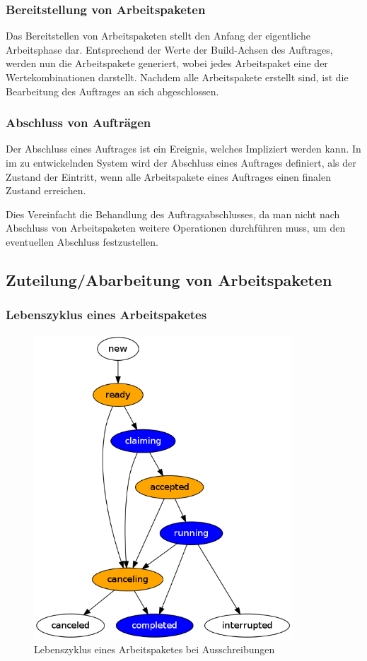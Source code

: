 \subsubsection{Bereitstellung von Arbeitspaketen}

Das Bereitstellen von Arbeitspaketen stellt den Anfang der eigentliche Arbeitsphase dar.
Entsprechend der Werte der Build-Achsen des Auftrages, werden nun die Arbeitspakete generiert,
wobei jedes Arbeitspaket eine der Wertekombinationen darstellt.
Nachdem alle Arbeitspakete erstellt sind, ist die Bearbeitung des Auftrages an sich abgeschlossen.

\subsubsection{Abschluss von Aufträgen}

Der Abschluss eines Auftrages ist ein Ereignis, welches Impliziert werden kann.
In im zu entwickelnden System wird der Abschluss eines Auftrages definiert,
als der Zustand der Eintritt, wenn alle Arbeitspakete eines Auftrages
einen finalen Zustand erreichen.

Dies Vereinfacht die Behandlung des Auftragsabschlusses,
da man nicht nach Abschluss von Arbeitspaketen weitere Operationen durchführen muss,
um den eventuellen Abschluss festzustellen.

\subsection{Zuteilung/Abarbeitung von Arbeitspaketen}


\subsubsection{Lebenszyklus eines Arbeitspaketes}


\begin{figure}[ht] 
  \centering
  \label{fig:lebenszyklus-arbeitspaket}
  \includegraphics[height=4.5in]{imageinput/lebenszyklus-arbeitspaket.png}
  \caption{Lebenszyklus eines Arbeitspaketes bei Ausschreibungen}
\end{figure}


